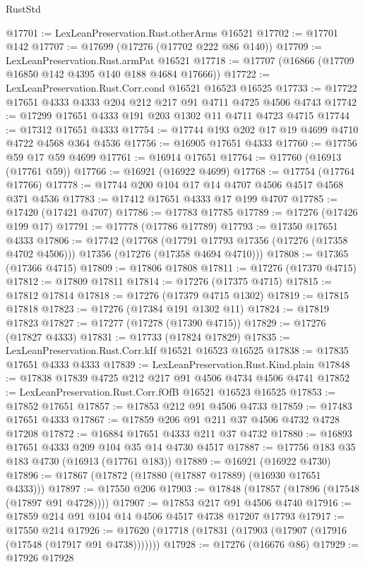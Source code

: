 \begin{lexlean}{RustStd}
\begin{coremodule}
@17701 := LexLeanPreservation.Rust.otherArms @16521
@17702 := @17701 @142
@17707 := @17699 (@17276 (@17702 @222 @86 @140))
@17709 := LexLeanPreservation.Rust.armPat @16521
@17718 := @17707 (@16866 (@17709 @16850 @142 @4395 @140 @188 @4684 @17666))
@17722 := LexLeanPreservation.Rust.Corr.cond @16521 @16523 @16525
@17733 := @17722 @17651 @4333 @4333 @204 @212 @217 @91 @4711 @4725 @4506 @4743
@17742 := @17299 @17651 @4333 @191 @203 @1302 @11 @4711 @4723 @4715
@17744 := @17312 @17651 @4333
@17754 := @17744 @193 @202 @17 @19 @4699 @4710 @4722 @4568 @364 @4536
@17756 := @16905 @17651 @4333
@17760 := @17756 @59 @17 @59 @4699
@17761 := @16914 @17651
@17764 := @17760 (@16913 (@17761 @59))
@17766 := @16921 (@16922 @4699)
@17768 := @17754 (@17764 @17766)
@17778 := @17744 @200 @104 @17 @14 @4707 @4506 @4517 @4568 @371 @4536
@17783 := @17412 @17651 @4333 @17 @199 @4707
@17785 := @17420 (@17421 @4707)
@17786 := @17783 @17785
@17789 := @17276 (@17426 @199 @17)
@17791 := @17778 (@17786 @17789)
@17793 := @17350 @17651 @4333
@17806 := @17742
    (@17768
      (@17791 @17793 @17356 (@17276 (@17358 @4702 @4506)))
      @17356
      (@17276 (@17358 @4694 @4710)))
@17808 := @17365 (@17366 @4715)
@17809 := @17806 @17808
@17811 := @17276 (@17370 @4715)
@17812 := @17809 @17811
@17814 := @17276 (@17375 @4715)
@17815 := @17812 @17814
@17818 := @17276 (@17379 @4715 @1302)
@17819 := @17815 @17818
@17823 := @17276 (@17384 @191 @1302 @11)
@17824 := @17819 @17823
@17827 := @17277 (@17278 (@17390 @4715))
@17829 := @17276 (@17827 @4333)
@17831 := @17733 (@17824 @17829)
@17835 := LexLeanPreservation.Rust.Corr.kIf @16521 @16523 @16525
@17838 := @17835 @17651 @4333 @4333
@17839 := LexLeanPreservation.Rust.Kind.plain
@17848 := @17838 @17839 @4725 @212 @217 @91 @4506 @4734 @4506 @4741
@17852 := LexLeanPreservation.Rust.Corr.fOfB @16521 @16523 @16525
@17853 := @17852 @17651
@17857 := @17853 @212 @91 @4506 @4733
@17859 := @17483 @17651 @4333
@17867 := @17859 @206 @91 @211 @37 @4506 @4732 @4728 @17208
@17872 := @16884 @17651 @4333 @211 @37 @4732
@17880 := @16893 @17651 @4333 @209 @104 @35 @14 @4730 @4517
@17887 := @17756 @183 @35 @183 @4730 (@16913 (@17761 @183))
@17889 := @16921 (@16922 @4730)
@17896 := @17867 (@17872 (@17880 (@17887 @17889) (@16930 @17651 @4333)))
@17897 := @17550 @206
@17903 := @17848 (@17857 (@17896 (@17548 (@17897 @91 @4728))))
@17907 := @17853 @217 @91 @4506 @4740
@17916 := @17859 @214 @91 @104 @14 @4506 @4517 @4738 @17207 @17793
@17917 := @17550 @214
@17926 := @17620 (@17718 (@17831 (@17903 (@17907 (@17916 (@17548 (@17917 @91 @4738)))))))
@17928 := @17276 (@16676 @86)
@17929 := @17926 @17928

\end{coremodule}
\end{lexlean}
